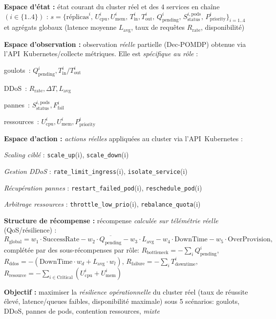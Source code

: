 \begin{enumerate*}[label={\roman*)}, itemjoin={;\quad}]
  \item \textbf{Espace d'état :} état courant du cluster réel et des 4 services en chaîne \((i \in \{1..4\})\) :
  \(
  s = \{\text{réplicas}^i,\,
  U_{\text{cpu}}^i, U_{\text{mem}}^i,\,
  T_{\text{in}}^i, T_{\text{out}}^i,\,
  Q_{\text{pending}}^i,\,
  S_{\text{status}}^{i,\text{pods}},\,
  P_{\text{priority}}^i\}_{i=1..4}
  \)
  et agrégats globaux (latence moyenne \(L_{\text{avg}}\), taux de requêtes \(R_{\text{rate}}\), disponibilité)
  \item \textbf{Espace d'observation :} observation \emph{réelle} partielle (Dec-POMDP) obtenue via l’API~Kubernetes/collecte métriques. Elle est \emph{spécifique au rôle} :
  \begin{enumerate*}[label={}, itemjoin={;\,}]
    \item goulots~: \(Q_{\text{pending}}^i, T_{\text{in}}^i/T_{\text{out}}^i\)
    \item DDoS~: \(R_{\text{rate}}, \Delta T, L_{\text{avg}}\)
    \item pannes~: \(S_{\text{status}}^{i,\text{pods}}, F_{\text{fail}}^i\)
    \item ressources~: \(U_{\text{cpu}}^i, U_{\text{mem}}^i, P_{\text{priority}}^i\)
  \end{enumerate*}
  \item \textbf{Espace d'action :} \emph{actions réelles} appliquées au cluster via l’API~Kubernetes :
  \begin{enumerate*}[label={\roman*)}, itemjoin={;\quad}]
    \item \emph{Scaling ciblé} : \texttt{scale\_up}(i), \texttt{scale\_down}(i)
    \item \emph{Gestion DDoS} : \texttt{rate\_limit\_ingress}(i), \texttt{isolate\_service}(i)
    \item \emph{Récupération pannes} : \texttt{restart\_failed\_pod}(i), \texttt{reschedule\_pod}(i)
    \item \emph{Arbitrage ressources} : \texttt{throttle\_low\_prio}(i), \texttt{rebalance\_quota}(i)
  \end{enumerate*}
  \item \textbf{Structure de récompense :} récompense \emph{calculée sur télémétrie réelle} (QoS/résilience) :
  \[
    R_{\text{global}}=
    w_1\cdot\text{SuccessRate}
    -w_2\cdot\overline{Q_{\text{pending}}}
    -w_3\cdot L_{\text{avg}}
    -w_4\cdot \text{DownTime}
    -w_5\cdot \text{OverProvision},
  \]
  complétée par des sous-récompenses par rôle:
  \(R_{\text{bottleneck}}=-\sum_i Q_{\text{pending}}^i\),
  \(R_{\text{ddos}}=-(\text{DownTime}\cdot w_d+L_{\text{avg}}\cdot w_l)\),
  \(R_{\text{failure}}=-\sum_i T_{\text{downtime}}^i\),
  \(R_{\text{resource}}=-\sum_{i\in\text{Critical}}(U_{\text{cpu}}^i+U_{\text{mem}}^i)\)
  \item \textbf{Objectif :} maximiser la \emph{résilience opérationnelle} du cluster réel (taux de réussite élevé, latence/queues faibles, disponibilité maximale) sous 5 scénarios: goulots, DDoS, pannes de pods, contention ressources, \emph{mixte}
\end{enumerate*}

